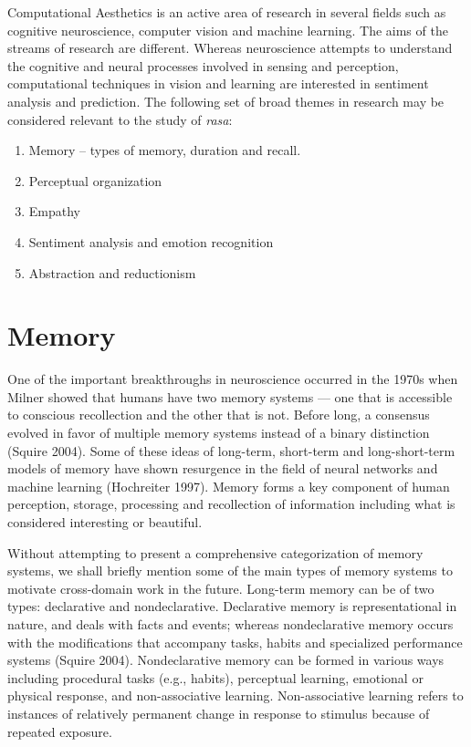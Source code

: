Computational Aesthetics is an active area of research in several fields such as cognitive neuroscience, computer vision and machine learning. The aims of the streams of research are different. Whereas neuroscience attempts to understand the cognitive and neural processes involved in sensing and perception, computational techniques in vision and learning are interested in sentiment analysis and prediction. The following set of broad themes in research may be considered relevant to the study of \textsl{rasa}:
\begin{enumerate}
\itemsep=0pt
\item Memory -- types of memory, duration and recall. 
\item Perceptual organization
\item Empathy
\item Sentiment analysis and emotion recognition
\item Abstraction and reductionism
\end{enumerate}

\section*{Memory}

One of the important breakthroughs in neuroscience occurred in the 1970s when Milner showed that humans have two memory systems --- one that is accessible to conscious recollection and the other that is not. Before long, a consensus evolved in favor of multiple memory systems instead of a binary distinction (Squire 2004). Some of these ideas of long-term, short-term and long-short-term models of memory have shown resurgence in the field of neural networks and machine learning (Hochreiter 1997). Memory forms a key component of human perception, storage, processing and recollection of information including what is considered interesting or beautiful. 

Without attempting to present a comprehensive categorization of memory systems, we shall briefly mention some of the main types of memory systems to motivate cross-domain work in the future. Long-term memory can be of two types: declarative and nondeclarative. Declarative memory is representational in nature, and deals with facts and events; whereas nondeclarative memory occurs with the modifications that accompany tasks, habits and specialized performance systems (Squire 2004). Nondeclarative memory can be formed in various ways including procedural tasks (e.g., habits), perceptual learning, emotional or physical response, and non-associative learning. Non-associative learning refers to instances of relatively permanent change in response to stimulus because of repeated exposure. 

